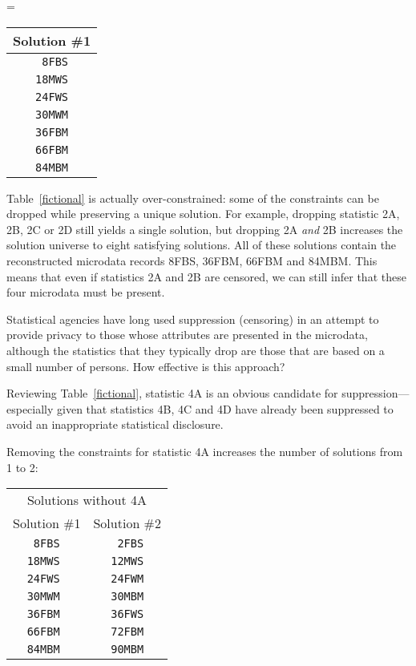 \documentclass[runningheads]{llncs}
\begin{document}
\begin{center}
\begin{minipage}{1.5in}
  
\end{minipage}
\begin{minipage}{.5in}
  =
\end{minipage}
\begin{minipage}{1.5in}
\begin{tabular}{c}
  Solution \#1\\
  \hline
\texttt{ 8FBS}\\
\texttt{18MWS}\\
\texttt{24FWS}\\
\texttt{30MWM}\\
\texttt{36FBM}\\
\texttt{66FBM}\\
\texttt{84MBM}\\
\end{tabular}
\end{minipage}
\end{center}  
Table~\ref{fictional} is actually over-constrained: some of the
constraints can be dropped while preserving a unique
solution. For example, dropping statistic 2A, 2B, 2C or 2D still yields a
single solution, but dropping 2A \emph{and} 2B increases the solution universe to
eight satisfying solutions. All of these solutions contain the
reconstructed microdata records 8FBS, 36FBM, 66FBM and 84MBM. This
means that even if statistics 2A and 2B are censored, we can still
infer that these four microdata must be present.

Statistical agencies have long used suppression (censoring) in an
attempt to provide privacy to those whose attributes are presented in
the microdata, although the statistics that they typically drop are
those that are based on a small number of persons. How effective is
this approach?

Reviewing Table~\ref{fictional}, statistic 4A is an obvious candidate
for suppression---especially given that statistics 4B, 4C and 4D have
already been suppressed to avoid an inappropriate statistical
disclosure.

Removing the constraints for statistic 4A increases the number of
solutions from 1 to 2:

\begin{center}
\begin{tabular}{c|c}
\multicolumn{2}{c}{Solutions without 4A}\\
  Solution \#1 & Solution \#2 \\
\hline
 \texttt{ 8FBS } &  \texttt{ 2FBS} \\
 \texttt{18MWS } &  \texttt{12MWS} \\
 \texttt{24FWS } &  \texttt{24FWM} \\
 \texttt{30MWM } &  \texttt{30MBM} \\
 \texttt{36FBM } &  \texttt{36FWS} \\
 \texttt{66FBM } &  \texttt{72FBM} \\
 \texttt{84MBM } &  \texttt{90MBM} \\
  \end{tabular}
\end{center}
\end{document}
